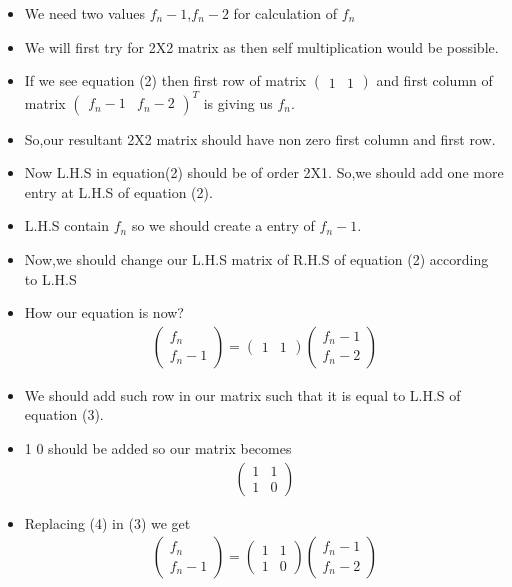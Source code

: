 \documentclass[journal,12pt,twocolumn]{IEEEtran}
\begin{document}
\begin{itemize}
    \item We need two values $f_n-1$,$f_n-2$ for calculation of $f_n$
    \item We will first try for 2X2 matrix as then self multiplication would be possible.
    \item If we see equation (2) then first row of matrix $\begin{pmatrix}1 & 1\end{pmatrix}$ and first column of matrix $\begin{pmatrix} f_n-1 & f_n-2\end{pmatrix}^T$ is giving us $f_n$.
    \item So,our resultant 2X2 matrix should have non zero first column and first row.
    \item Now L.H.S in equation(2) should be of order 2X1.
    So,we should add one more entry at L.H.S of equation (2).\\
    \item L.H.S contain $f_n$ so we should create a entry of $f_n-1$.
    \item Now,we should change our L.H.S matrix of R.H.S of equation (2) according to L.H.S
    \item How our equation is now?
    \begin{align}
      \begin{pmatrix}f_n\\f_n-1\end{pmatrix}=\begin{pmatrix}1 & 1\end{pmatrix}\begin{pmatrix}f_n-1\\f_n-2\end{pmatrix}
    \end{align}
    \item We should add such row in our matrix such that it is equal to L.H.S of equation (3).
    \item 1 0 should be added so our matrix becomes\\
    \begin{align}
    \begin{pmatrix}1 & 1\\1 & 0\end{pmatrix}
    \end{align}
    \item Replacing (4) in (3) we get
    \begin{align}
      \boxed{\begin{pmatrix}f_n\\f_n-1\end{pmatrix}=\begin{pmatrix}1 & 1\\1 & 0\end{pmatrix}\begin{pmatrix}f_n-1\\f_n-2\end{pmatrix}}
    \end{align}
    
\end{itemize}
\end{document}
